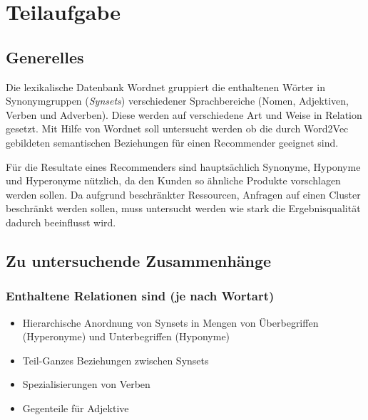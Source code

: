 \section{Teilaufgabe}

\subsection{Generelles}

%

Die lexikalische Datenbank Wordnet gruppiert die enthaltenen Wörter in Synonymgruppen (\emph{Synsets})  verschiedener Sprachbereiche (Nomen, Adjektiven, Verben und Adverben). Diese werden auf verschiedene Art und Weise in Relation gesetzt. Mit Hilfe von Wordnet soll untersucht werden ob die durch Word2Vec gebildeten semantischen Beziehungen für einen Recommender geeignet sind.

Für die Resultate eines Recommenders sind hauptsächlich Synonyme, Hyponyme und Hyperonyme nützlich, da den Kunden so ähnliche Produkte vorschlagen werden sollen. Da aufgrund beschränkter Ressourcen, Anfragen auf einen Cluster beschränkt werden sollen, muss untersucht werden wie stark die Ergebnisqualität dadurch beeinflusst wird.

\subsection{Zu untersuchende Zusammenhänge}


\subsubsection{Enthaltene Relationen sind (je nach Wortart)}

\begin{itemize}
\item{Hierarchische Anordnung von Synsets in Mengen von Überbegriffen (Hyperonyme) und Unterbegriffen (Hyponyme)}
\item{Teil-Ganzes Beziehungen zwischen Synsets}
\item{Spezialisierungen von Verben}
\item{Gegenteile für Adjektive}
\end{itemize}


